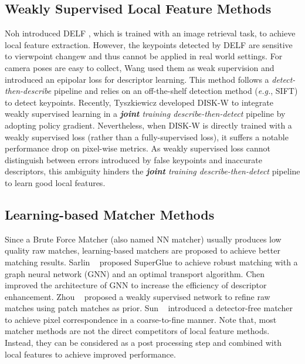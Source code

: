 \documentclass[10pt,twocolumn,letterpaper]{article}
\begin{document}
\subsection{Weakly Supervised Local Feature Methods}
Noh \etal introduced DELF \cite{noh2017large}, which is trained with an image retrieval task, to achieve local feature extraction. However, the keypoints detected by DELF are sensitive to vierwpoint changew and thus cannot be applied in real world settings. For camera poses are easy to collect, Wang \etal \cite{wangLearningFeatureDescriptors2020} used them as weak supervision and introduced an epipolar loss for descriptor learning. This method follows a \textit{detect-then-describe} pipeline and relies on an off-the-shelf detection method (\emph{e.g.}, SIFT) to detect keypoints.  
Recently, Tyszkiewicz \etal \cite{tyszkiewiczDISKLearningLocal2020a} developed DISK-W to integrate weakly supervised learning in a \textit{\textbf{joint} training describe-then-detect} pipeline by adopting policy gradient. 
Nevertheless, when DISK-W is directly trained with a weakly supervised loss (rather than a fully-supervised loss), it suffers a notable performance drop on pixel-wise metrics. As weakly supervised loss cannot distinguish between errors introduced by false keypoints and inaccurate descriptors, this ambiguity hinders the \textit{\textbf{joint} training describe-then-detect} pipeline to learn good local features. 

\subsection{Learning-based Matcher Methods}
\label{related_matcher}
Since a Brute Force Matcher (also named NN matcher) usually produces low quality raw matches, learning-based matchers are proposed to achieve better matching results. Sarlin \etal~\cite{sarlin2020superglue} proposed SuperGlue to achieve robust matching with a graph neural network (GNN) and an optimal transport algorithm. Chen \etal~\cite{chen2021learning} improved the architecture of GNN to increase the efficiency of descriptor enhancement. Zhou \etal~\cite{zhou2021patch2pix} proposed a weakly supervised network to refine raw matches using patch matches as prior. Sun \etal~\cite{sunLoFTRDetectorFreeLocal2021} introduced a detector-free matcher to achieve pixel correspondence in a coarse-to-fine manner. Note that, most matcher methods are not the direct competitors of local feature methods. Instead, they can be considered as a post processing step and combined with local features to achieve improved performance.
\end{document}
